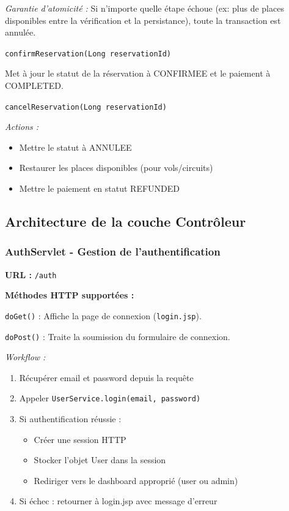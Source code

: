 \documentclass[12pt,a4paper]{report}
\begin{document}
\textit{Garantie d'atomicité :} Si n'importe quelle étape échoue (ex: plus de places disponibles entre la vérification et la persistance), toute la transaction est annulée.

\texttt{confirmReservation(Long reservationId)}

Met à jour le statut de la réservation à CONFIRMEE et le paiement à COMPLETED.

\texttt{cancelReservation(Long reservationId)}

\textit{Actions :}
\begin{itemize}
    \item Mettre le statut à ANNULEE
    \item Restaurer les places disponibles (pour vols/circuits)
    \item Mettre le paiement en statut REFUNDED
\end{itemize}

\subsection{Architecture de la couche Contrôleur}

\subsubsection{AuthServlet - Gestion de l'authentification}

\textbf{URL :} \texttt{/auth}

\textbf{Méthodes HTTP supportées :}

\texttt{doGet()} : Affiche la page de connexion (\texttt{login.jsp}).

\texttt{doPost()} : Traite la soumission du formulaire de connexion.

\textit{Workflow :}
\begin{enumerate}
    \item Récupérer email et password depuis la requête
    \item Appeler \texttt{UserService.login(email, password)}
    \item Si authentification réussie :
    \begin{itemize}
        \item Créer une session HTTP
        \item Stocker l'objet User dans la session
        \item Rediriger vers le dashboard approprié (user ou admin)
    \end{itemize}
    \item Si échec : retourner à login.jsp avec message d'erreur
\end{enumerate}
\end{document}
